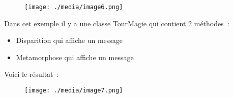 \documentclass[12pt]{article}
\begin{document}
\vspace{\baselineskip}

\vspace{\baselineskip}



\begin{figure}[H]
	\begin{Center}
		\texttt{[image: ./media/image6.png]}
	\end{Center}
\end{figure}



\par


\vspace{\baselineskip}

\vspace{\baselineskip}
Dans cet exemple il y a une classe TourMagie qui contient 2 méthodes : \par

\begin{itemize}
	\item Disparition qui affiche un message\par

	\item Metamorphose qui affiche un message
\end{itemize}\par


\vspace{\baselineskip}

\vspace{\baselineskip}
 Voici le résultat : \par


\vspace{\baselineskip}



\begin{figure}[H]
	\begin{Center}
		\texttt{[image: ./media/image7.png]}
	\end{Center}
\end{figure}



\par
\end{document}
